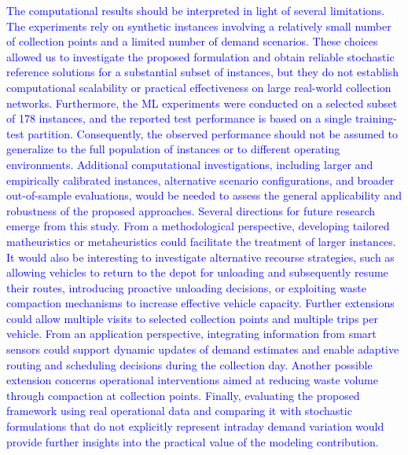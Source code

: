 \documentclass[authoryear,preprint,12pt]{elsarticle}
\newcommand{\rev}[1]{\textcolor{blue}{{#1}}}
\begin{document}
\rev{The computational results should be interpreted in light of several limitations. The experiments rely on synthetic instances involving a relatively small number of collection points and a limited number of demand scenarios. These choices allowed us to investigate the proposed formulation and obtain reliable stochastic reference solutions for a substantial subset of instances, but they do not establish computational scalability or practical effectiveness on large real-world collection networks. Furthermore, the ML experiments were conducted on a selected subset of 178 instances, and the reported test performance is based on a single training-test partition. Consequently, the observed performance should not be assumed to generalize to the full population of instances or to different operating environments. Additional computational investigations, including larger and empirically calibrated instances, alternative scenario configurations, and broader out-of-sample evaluations, would be needed to assess the general applicability and robustness of the proposed approaches. Several directions for future research emerge from this study. From a methodological perspective, developing tailored matheuristics or metaheuristics could facilitate the treatment of larger instances. It would also be interesting to investigate alternative recourse strategies, such as allowing vehicles to return to the depot for unloading and subsequently resume their routes, introducing proactive unloading decisions, or exploiting waste compaction mechanisms to increase effective vehicle capacity. Further extensions could allow multiple visits to selected collection points and multiple trips per vehicle. From an application perspective, integrating information from smart sensors could support dynamic updates of demand estimates and enable adaptive routing and scheduling decisions during the collection day. Another possible extension concerns operational interventions aimed at reducing waste volume through compaction at collection points. Finally, evaluating the proposed framework using real operational data and comparing it with stochastic formulations that do not explicitly represent intraday demand variation would provide further insights into the practical value of the modeling contribution.}
\end{document}
